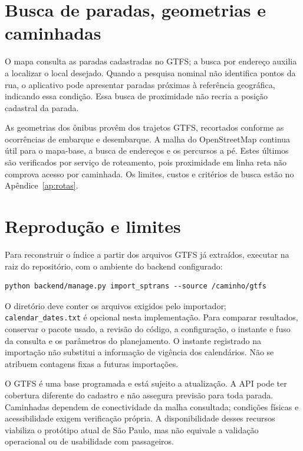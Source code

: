 \documentclass[12pt,oneside,a4paper,brazil,chapter=TITLE]{abntex2}
\let\papsection\section
\renewcommand{\section}{\clearpage\papsection}
\begin{document}
\begin{apendicesenv}
\section{Busca de paradas, geometrias e caminhadas}
O mapa consulta as paradas cadastradas no GTFS; a busca por endereço auxilia a localizar o local desejado. Quando a pesquisa nominal não identifica pontos da rua, o aplicativo pode apresentar paradas próximas à referência geográfica, indicando essa condição. Essa busca de proximidade não recria a posição cadastral da parada.

As geometrias dos ônibus provêm dos trajetos GTFS, recortados conforme as ocorrências de embarque e desembarque. A malha do OpenStreetMap continua útil para o mapa-base, a busca de endereços e os percursos a pé. Estes últimos são verificados por serviço de roteamento, pois proximidade em linha reta não comprova acesso por caminhada. Os limites, custos e critérios de busca estão no Apêndice~\ref{ap:rotas}.

\section{Reprodução e limites}
Para reconstruir o índice a partir dos arquivos GTFS já extraídos, executar na raiz do repositório, com o ambiente do backend configurado:
\begin{verbatim}
python backend/manage.py import_sptrans --source /caminho/gtfs
\end{verbatim}
O diretório deve conter os arquivos exigidos pelo importador; \texttt{calendar\_dates.txt} é opcional nesta implementação. Para comparar resultados, conservar o pacote usado, a revisão do código, a configuração, o instante e fuso da consulta e os parâmetros do planejamento. O instante registrado na importação não substitui a informação de vigência dos calendários. Não se atribuem contagens fixas a futuras importações.

O GTFS é uma base programada e está sujeito a atualização. A API pode ter cobertura diferente do cadastro e não assegura previsão para toda parada. Caminhadas dependem de conectividade da malha consultada; condições físicas e acessibilidade exigem verificação própria. A disponibilidade desses recursos viabiliza o protótipo atual de São Paulo, mas não equivale a validação operacional ou de usabilidade com passageiros.




\end{apendicesenv}
\end{document}
